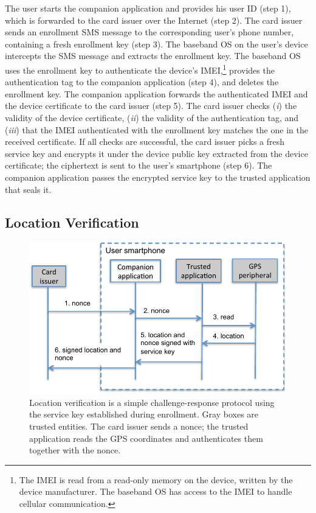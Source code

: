 The user starts the companion application and provides his user ID (step 1),
which is forwarded to the card issuer over the Internet (step 2). The card
issuer sends an enrollment SMS message to the corresponding user's phone
number, containing a fresh enrollment key (step 3). The baseband OS on the
user's device intercepts the SMS message and extracts the enrollment key. The
baseband OS uses the enrollment key to authenticate the device's
IMEI,\footnote{The IMEI is read from a read-only memory on the device, written
by the device manufacturer. The baseband OS has access to the IMEI to handle
cellular communication.} provides the authentication tag to the companion
application (step 4), and deletes the enrollment key. The companion application
forwards the authenticated IMEI and the device certificate to the card issuer
(step 5). The card issuer checks (\emph{i}) the validity of the device certificate,
(\emph{ii}) the validity of the authentication tag, and (\emph{iii}) that the IMEI
authenticated with the enrollment key matches the one in the received
certificate. If all checks are successful, the card issuer picks a fresh
service key and encrypts it under the device public key extracted from the
device certificate; the ciphertext is sent to the user's smartphone (step 6).
The companion application passes the encrypted service key to the trusted
application that seals it.

\subsection{Location Verification}
\label{sec:ps_tee_locationverification}

\begin{figure}[!ht]
    \centering
    \includegraphics[width=0.95\linewidth]{figures/phonesecures/tee_verification}
    \caption[Location verification is a challenge-response protocol using the
    service key established during enrollment]{Location verification is a
    simple challenge-response protocol using the service key established during
    enrollment. Gray boxes are trusted entities. The card issuer sends a nonce;
    the trusted application reads the GPS coordinates and authenticates them
    together with the nonce.}
    \label{fig:ps_tee_verification}
\end{figure}

